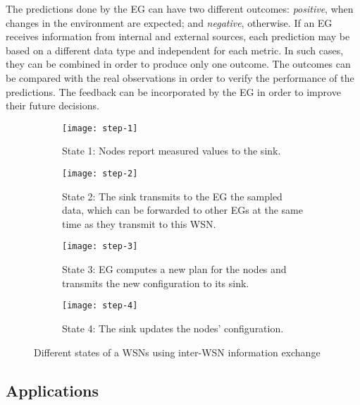 \documentclass{llncs}
\newcommand{\EG}[1]{EG}
\begin{document}
The predictions done by the \EG{} can have two different outcomes: 
\emph{positive}, when changes in the environment are expected; and 
\emph{negative}, otherwise.
If an \EG{} receives information from internal and external sources, each 
prediction may be based on a different data type and independent for each 
metric. In such cases, they can be combined in order to produce only one 
outcome.
The outcomes can be compared with the real observations in order to verify the 
performance of the predictions. 
The feedback can be incorporated by the \EG{s} in order to improve their 
future decisions.

\begin{figure}[h]
        \centering
        \begin{subfigure}[t]{0.21\textwidth}
                \centering
                \texttt{[image: step-1]}
                \caption{State 1: Nodes report measured values to the sink.}
                \label{fig:step-1}
        \end{subfigure}\qquad
        \begin{subfigure}[t]{0.21\textwidth}
                \centering
                \texttt{[image: step-2]}
                \caption{State 2: The sink transmits to the EG the sampled 
data, which 
                         can be forwarded to other EGs at the same time as they 
                         transmit to this WSN.}
                \label{fig:step-2}
        \end{subfigure}\qquad
        \begin{subfigure}[t]{0.21\textwidth}
                \centering
                \texttt{[image: step-3]}
                \caption{State 3: EG computes a new plan for the nodes and 
transmits the 
                         new configuration to its sink.}
                \label{fig:step-3}
        \end{subfigure}\qquad
        \begin{subfigure}[t]{0.21\textwidth}
                \centering
                \texttt{[image: step-4]}
                \caption{State 4: The sink updates the nodes' configuration.}
                \label{fig:step-4}
        \end{subfigure}\caption{Different states of a WSNs using inter-WSN information 
exchange}
        \label{fig:steps}
\end{figure}




\subsection{Applications}
\label{section:approaches}
\end{document}
